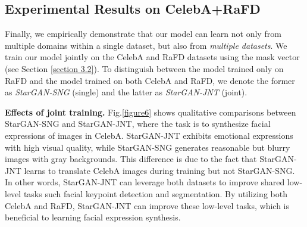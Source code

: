 \documentclass[10pt,twocolumn,letterpaper]{article}
\begin{document}
\subsection{Experimental Results on CelebA+RaFD}


Finally, we empirically demonstrate that our model can learn not only from multiple domains within a single dataset, but also from \textit{multiple datasets}. We train our model jointly on the CelebA and RaFD datasets using the mask vector (see Section \ref{section 3.2}). To distinguish between the model trained only on RaFD and the model trained on both CelebA and RaFD, we denote the former as \textit{StarGAN-SNG} (single) and the latter as \textit{StarGAN-JNT} (joint). 

\smallskip

\noindent\textbf{Effects of joint training.} Fig.\thinspace\ref{figure6} shows qualitative comparisons between StarGAN-SNG and StarGAN-JNT, where the task is to synthesize facial expressions of images in CelebA. StarGAN-JNT exhibits emotional expressions with high visual quality, while StarGAN-SNG generates reasonable but blurry images with gray backgrounds. This difference is due to the fact that StarGAN-JNT learns to translate CelebA images during training but not StarGAN-SNG. In other words, StarGAN-JNT can leverage both datasets to improve shared low-level tasks such facial keypoint detection and segmentation. By utilizing both CelebA and RaFD, StarGAN-JNT can improve these low-level tasks, which is beneficial to learning facial expression synthesis. 

\end{document}
